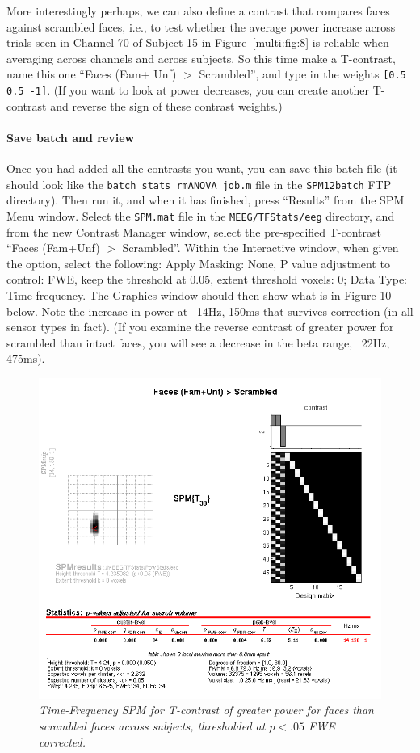More interestingly perhaps, we can also define a contrast that compares faces against scrambled faces, i.e., to test whether the average power increase across trials seen in Channel 70 of Subject 15 in Figure~\ref{multi:fig:8} is reliable when averaging across channels and across subjects. So this time make a T-contrast, name this one ``Faces (Fam+ Unf) \(>\) Scrambled'', and type in the weights \texttt{[0.5 0.5 -1]}. (If you want to look at power decreases, you can create another T-contrast and reverse the sign of these contrast weights.)

\paragraph{Save batch and review}

Once you had added all the contrasts you want, you can save this batch file (it should look like the \texttt{batch\_stats\_rmANOVA\_job.m} file in the \texttt{SPM12batch} FTP directory). Then run it, and when it has finished, press ``Results'' from the SPM Menu window. Select the \texttt{SPM.mat} file in the \texttt{MEEG/TFStats/eeg} directory, and from the new Contrast Manager window, select the pre-specified T-contrast ``Faces (Fam+Unf) \(>\) Scrambled''.  Within the Interactive window, when given the option, select the following:  Apply Masking: None, P value adjustment to control: FWE, keep the threshold at 0.05, extent threshold {voxels}: 0; Data Type: Time-frequency. The Graphics window should then show what is in Figure 10 below.  Note the increase in power at ~14Hz, 150ms that survives correction (in all sensor types in fact). (If you examine the reverse contrast of greater power for scrambled than intact faces, you will see a decrease in the beta range, ~22Hz, 475ms).

\begin{figure}
\begin{center}
\includegraphics[width=120mm]{multi/figures/figure10}
\caption{\em Time-Frequency SPM for T-contrast of greater power for faces than scrambled faces across subjects, thresholded at \(p<.05\) FWE corrected. \label{multi:fig:10}}
\end{center}
\end{figure}

